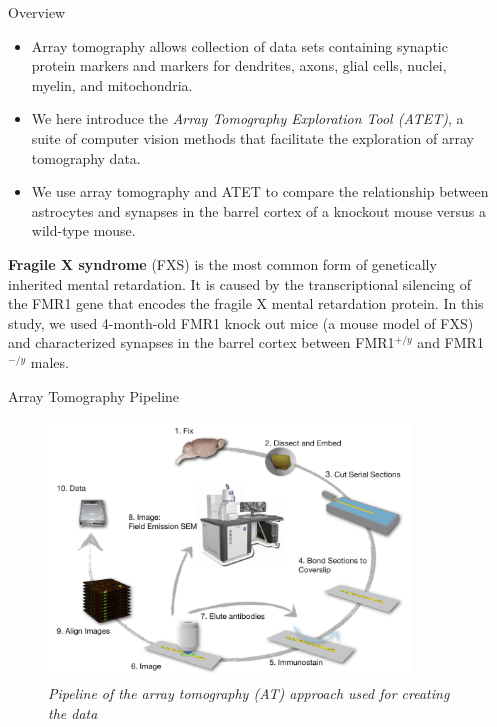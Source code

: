 \documentclass[final, table]{beamer}
\newlength{\sepwid}
\newlength{\onecolwid}
\begin{document}
\begin{frame}[t]  
\begin{columns}[t]  %

\begin{column}{\sepwid}\end{column}  %
\begin{column}{\onecolwid} 

\begin{block}{Overview} 

\begin{itemize}

\item Array tomography allows collection of data sets containing synaptic protein markers and markers for dendrites, axons, glial cells, nuclei, myelin, and mitochondria.

\item We here introduce the {\it Array Tomography Exploration Tool (ATET)}, a suite of computer vision methods that facilitate the exploration of array tomography data. 

\item We use array tomography and ATET to compare the relationship between astrocytes and synapses in the barrel cortex of a knockout mouse versus a wild-type mouse. 

\end{itemize}

\textbf{Fragile X syndrome} (FXS) is the most common form of genetically inherited mental retardation.  It is caused by the transcriptional silencing of the FMR1 gene that encodes the fragile X mental retardation protein. In this study, we used 4-month-old FMR1 knock out mice (a mouse model of FXS) and characterized synapses in the barrel cortex between FMR1$^{+/y}$ and FMR1$^{-/y}$ males.


\end{block}

\begin{block}{Array Tomography Pipeline} 

\begin{figure}
\centering
\includegraphics[width=0.9\textwidth]{figs/atpipeline}
\caption{\textit{Pipeline of the array tomography (AT) approach used for creating the data}}
\end{figure}


\end{block}
\end{column}
\end{columns}
\end{frame}
\end{document}
